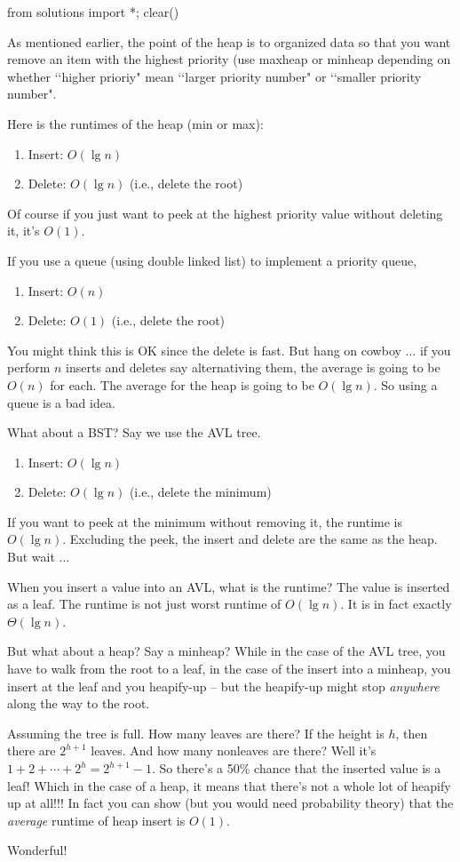 \begin{python0}
from solutions import *; clear()
\end{python0}

As mentioned earlier, the point of the heap is to
organized data so that you want remove an item
with the highest priority (use maxheap or minheap depending
on whether \lq\lq higher prioriy" mean \lq\lq larger priority number"
or \lq\lq smaller priority number".

Here is the runtimes of the heap (min or max):
\begin{enumerate}[nosep]
\item Insert: $O(\lg n)$
\item Delete: $O(\lg n)$ (i.e., delete the root)
\end{enumerate}
Of course if you just want to peek at the highest priority value without deleting it,
it's $O(1)$.

If you use a queue (using double linked list) to implement a 
priority queue,
\begin{enumerate}[nosep]
\item Insert: $O(n)$
\item Delete: $O(1)$ (i.e., delete the root)
\end{enumerate}
You might think this is OK since the delete is fast.
But hang on cowboy ... if you perform $n$ inserts and deletes 
say alternativing them, the average is going to be $O(n)$ for each.
The average for the heap is going to be $O(\lg n)$.
So using a queue is a bad idea.

What about a BST? Say we use the AVL tree.
\begin{enumerate}[nosep]
\item Insert: $O(\lg n)$
\item Delete: $O(\lg n)$ (i.e., delete the minimum)
\end{enumerate}
If you want to peek at the minimum without removing it,
the runtime is $O(\lg n)$.
Excluding the peek, the insert and delete are the 
same as the heap.
But wait ...

When you insert a value into an AVL, what is the runtime?
The value is inserted as a leaf. The runtime is not just worst
runtime of $O(\lg n)$. It is in fact exactly $\Theta(\lg n)$.

But what about a heap? Say a minheap?
While in the case of the AVL tree, you have to walk from the root
to a leaf, in the case of the insert into a minheap,
you insert at the leaf and you heapify-up -- but the
heapify-up might stop \textit{anywhere} along the way to the root.

Assuming the tree is full.
How many leaves are there? If the height is $h$,
then there are $2^{h + 1}$ leaves.
And how many nonleaves are there?
Well it's $1 + 2 + \cdots + 2^{h} = 2^{h+1} - 1$.
So there's a 50\% chance that the inserted value is a leaf!
Which in the case of a heap, it means that there's not
a whole lot of heapify up at all!!!
In fact you can show (but you would need probability theory)
that the \textit{average} runtime of heap insert is $O(1)$.

Wonderful! 
